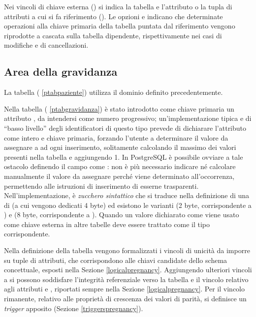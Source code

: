 Nei vincoli di chiave esterna () si indica la tabella e l'attributo o la tupla di attributi a cui si fa riferimento ().
Le opzioni  e  indicano che determinate operazioni alla chiave primaria della tabella puntata dal riferimento vengono riprodotte a cascata sulla tabella dipendente, rispettivamente nei casi di modifiche e di cancellazioni.

\subsection{Area della gravidanza}

La tabella  (\lstlistingname{} \ref{ptabpaziente}) utilizza il dominio  definito precedentemente.

Nella tabella  (\lstlistingname{} \ref{ptabgravidanza}) è stato introdotto come chiave primaria un attributo , da intendersi come numero progressivo; un'implementazione tipica e di \enquote{basso livello} degli identificatori di questo tipo prevede di dichiarare l'attributo come intero e chiave primaria, forzando l'utente a determinare il valore da assegnare a  ad ogni inserimento, solitamente calcolando il massimo dei valori  presenti nella tabella e aggiungendo 1.
In PostgreSQL \cite{Pos25} è possibile ovviare a tale ostacolo definendo il campo  come : non è più necessario indicare né calcolare manualmente il valore  da assegnare perché viene determinato all'occorrenza, permettendo alle istruzioni di inserimento di esserne trasparenti.
Nell'implementazione,  è \emph{zucchero sintattico} che si traduce nella definizione di una  di  (a cui vengono dedicati 4 byte) ed esistono le varianti  (2 byte, corrispondente a ) e  (8 byte, corrispondente a ).
Quando un valore dichiarato come  viene usato come chiave esterna in altre tabelle deve essere trattato come il tipo  corrispondente.

Nella definizione della tabella  vengono formalizzati i vincoli di unicità da imporre su tuple di attributi, che corrispondono alle chiavi candidate dello schema concettuale, esposti nella Sezione \ref{logicalpregnancy}.
Aggiungendo ulteriori vincoli a  si possono soddisfare l'integrità referenziale verso la tabella  e il vincolo relativo agli attributi  e , riportati sempre nella Sezione \ref{logicalpregnancy}.
Per il vincolo rimanente, relativo alle proprietà di crescenza dei valori di parità, si definisce un \emph{trigger} apposito (Sezione \ref{triggerspregnancy}).

